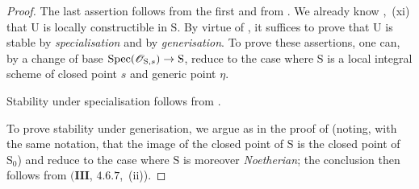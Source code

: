 \begin{proof}
The last assertion follows from the first and from .
We already know ,~(xi) that $\mathrm{U}$ is locally constructible in $\mathrm{S}$.
By virtue of , it suffices to prove that $\mathrm{U}$ is stable by \emph{specialisation} and by \emph{generisation}.
To prove these assertions, one can, by a change of base $\operatorname{Spec}(\mathscr{O}_{\mathrm{S},s})\to\mathrm{S}$, reduce to the case where $\mathrm{S}$ is a local integral scheme of closed point $s$ and generic point $\eta$.

Stability under specialisation follows from .

To prove stability under generisation, we argue as in the proof of  (noting, with the same notation, that the image of the closed point of $\mathrm{S}$ is the closed point of $\mathrm{S}_0$) and reduce to the case where $\mathrm{S}$ is moreover \emph{Noetherian}; the conclusion then follows from $(\mathbf{III}$, $4.6.7$,~(ii)).
\end{proof}

